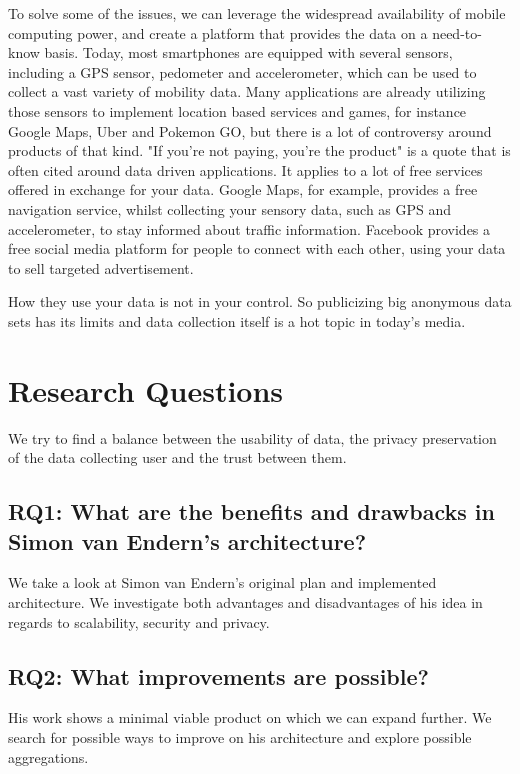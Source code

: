 To solve some of the issues, we can leverage the widespread availability of mobile computing power, and create a platform that provides the data on a need-to-know basis. Today, most smartphones are equipped with several sensors, including a GPS sensor, pedometer and accelerometer, which can be used to collect a vast variety of mobility data. Many applications are already utilizing those sensors to implement location based services and games, for instance Google Maps, Uber and Pokemon GO, but there is a lot of controversy around products of that kind. "If you're not paying, you're the product" is a quote that is often cited around data driven applications.
It applies to a lot of free services offered in exchange for your data. Google Maps, for example, provides a free navigation service, whilst collecting your sensory data, such as GPS and accelerometer, to stay informed about traffic information. Facebook provides a free social media platform for people to connect with each other, using your data to sell targeted advertisement.

How they use your data is not in your control. So publicizing big anonymous data sets has its limits and data collection itself is a hot topic in today's media. 

\section{Research Questions}
We try to find a balance between the usability of data, the privacy preservation of the data collecting user and the trust between them.
\subsection*{RQ1: What are the benefits and drawbacks in Simon van Endern's architecture?}
We take a look at Simon van Endern's original plan and implemented architecture. We investigate both advantages and disadvantages of his idea in regards to scalability, security and privacy.
\subsection*{RQ2: What improvements are possible?}
His work shows a minimal viable product on which we can expand further. We search for possible ways to improve on his architecture and explore possible aggregations.
